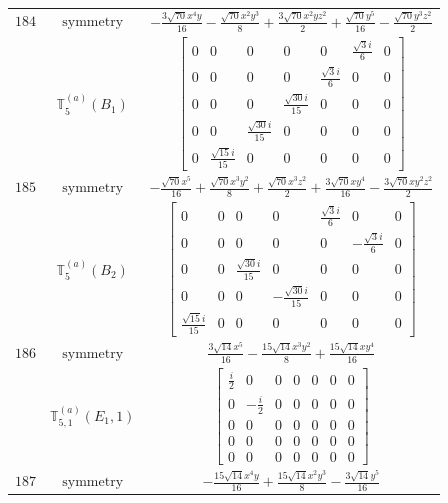 \documentclass[fleqn,8pt,landscape]{jsarticle}
\begin{document}
\begin{longtable}{ccc}
$ 184 $ & $ \text{symmetry} $ & $ - \frac{3 \sqrt{70} x^{4} y}{16} - \frac{\sqrt{70} x^{2} y^{3}}{8} + \frac{3 \sqrt{70} x^{2} y z^{2}}{2} + \frac{\sqrt{70} y^{5}}{16} - \frac{\sqrt{70} y^{3} z^{2}}{2} $ \\
$  $ & $ \mathbb{T}_{5}^{(a)}(B_{1}) $ & $ \begin{bmatrix} 0 & 0 & 0 & 0 & 0 & \frac{\sqrt{3} i}{6} & 0 \\ 0 & 0 & 0 & 0 & \frac{\sqrt{3} i}{6} & 0 & 0 \\ 0 & 0 & 0 & \frac{\sqrt{30} i}{15} & 0 & 0 & 0 \\ 0 & 0 & \frac{\sqrt{30} i}{15} & 0 & 0 & 0 & 0 \\ 0 & \frac{\sqrt{15} i}{15} & 0 & 0 & 0 & 0 & 0 \end{bmatrix} $ \\ \hline
$ 185 $ & $ \text{symmetry} $ & $ - \frac{\sqrt{70} x^{5}}{16} + \frac{\sqrt{70} x^{3} y^{2}}{8} + \frac{\sqrt{70} x^{3} z^{2}}{2} + \frac{3 \sqrt{70} x y^{4}}{16} - \frac{3 \sqrt{70} x y^{2} z^{2}}{2} $ \\
$  $ & $ \mathbb{T}_{5}^{(a)}(B_{2}) $ & $ \begin{bmatrix} 0 & 0 & 0 & 0 & \frac{\sqrt{3} i}{6} & 0 & 0 \\ 0 & 0 & 0 & 0 & 0 & - \frac{\sqrt{3} i}{6} & 0 \\ 0 & 0 & \frac{\sqrt{30} i}{15} & 0 & 0 & 0 & 0 \\ 0 & 0 & 0 & - \frac{\sqrt{30} i}{15} & 0 & 0 & 0 \\ \frac{\sqrt{15} i}{15} & 0 & 0 & 0 & 0 & 0 & 0 \end{bmatrix} $ \\ \hline
$ 186 $ & $ \text{symmetry} $ & $ \frac{3 \sqrt{14} x^{5}}{16} - \frac{15 \sqrt{14} x^{3} y^{2}}{8} + \frac{15 \sqrt{14} x y^{4}}{16} $ \\
$  $ & $ \mathbb{T}_{5,1}^{(a)}(E_{1},1) $ & $ \begin{bmatrix} \frac{i}{2} & 0 & 0 & 0 & 0 & 0 & 0 \\ 0 & - \frac{i}{2} & 0 & 0 & 0 & 0 & 0 \\ 0 & 0 & 0 & 0 & 0 & 0 & 0 \\ 0 & 0 & 0 & 0 & 0 & 0 & 0 \\ 0 & 0 & 0 & 0 & 0 & 0 & 0 \end{bmatrix} $ \\ \hline
$ 187 $ & $ \text{symmetry} $ & $ - \frac{15 \sqrt{14} x^{4} y}{16} + \frac{15 \sqrt{14} x^{2} y^{3}}{8} - \frac{3 \sqrt{14} y^{5}}{16} $ \\

\end{longtable}
\end{document}

